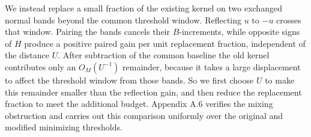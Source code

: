 We instead replace a small fraction of the existing kernel on two exchanged normal bands beyond the common threshold window. Reflecting \(u\) to \(-u\) crosses that window. Pairing the bands cancels their \(B\)-increments, while opposite signs of \(H\) produce a positive paired gain per unit replacement fraction, independent of the distance \(U\). After subtraction of the common baseline the old kernel contributes only an \(O_M(U^{-1})\) remainder, because it takes a large displacement to affect the threshold window from those bands. So we first choose \(U\) to make this remainder smaller than the reflection gain, and then reduce the replacement fraction to meet the additional budget. Appendix A.6 verifies the mixing obstruction and carries out this comparison uniformly over the original and modified minimizing thresholds.

